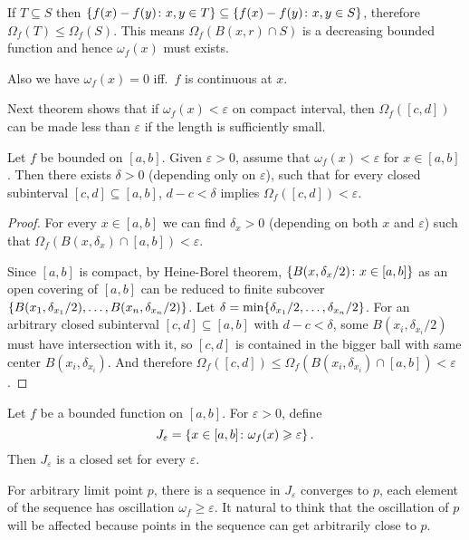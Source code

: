 \documentclass{article}
\DeclarePairedDelimiter\set{\lbrace}{\rbrace}
\begin{document}
If $ T \subseteq S $ then $ \set{f(x) - f(y) \colon x, y \in T} \subseteq \set{f(x) - f(y) \colon x, y \in S} $, therefore $ \Omega_f (T) \leqslant \Omega_f (S) $. This means $ \Omega_f (B(x, r) \cap S) $ is a decreasing bounded function and hence $ \omega_f (x) $ must exists.

Also we have $ \omega_f (x) = 0 $ iff.\ $ f $ is continuous at $ x $.

Next theorem shows that if $ \omega_f (x) < \varepsilon $ on compact interval, then $ \Omega_f ([c, d]) $ can be made less than $ \varepsilon $ if the length is sufficiently small.
\begin{theorem} \label{thm:oscillation-on-interval-control}
    Let $ f $ be bounded on $ [a, b] $. Given $ \varepsilon > 0 $, assume that $ \omega_f (x) < \varepsilon $ for $ x \in [a, b] $. Then there exists $ \delta > 0 $ (depending only on $ \varepsilon $), such that for every closed subinterval $ [c, d] \subseteq [a, b] $, $ d - c < \delta $ implies $ \Omega_f ([c, d]) < \varepsilon $.
\end{theorem}

\begin{proof}
    For every $ x \in [a, b] $ we can find $ \delta_x > 0 $ (depending on both $ x $ and $ \varepsilon $) such that $ \Omega_f (B(x, \delta_x) \cap [a, b]) < \varepsilon $.

    Since $ [a, b] $ is compact, by Heine-Borel theorem, $ \set{B(x, \delta_x / 2) \colon x \in [a, b]} $ as an open covering of $ [a, b] $ can be reduced to finite subcover $ \set{B(x_1, \delta_{x_1} / 2), \dots, B(x_n, \delta_{x_n} / 2)} $. Let $ \delta = \min \set{\delta_{x_1} / 2, \dots, \delta_{x_n} / 2} $. For an arbitrary closed subinterval $ [c, d] \subseteq [a, b] $ with $ d - c < \delta $, some $ B(x_i, \delta_{x_i} / 2) $ must have intersection with it, so $ [c, d] $ is contained in the bigger ball with same center $ B(x_i, \delta_{x_i}) $. And therefore $ \Omega_f ([c, d]) \leqslant \Omega_f (B(x_i, \delta_{x_i}) \cap [a, b]) < \varepsilon $.
\end{proof}

\begin{theorem} \label{thm:compact-J}
    Let $ f $ be a bounded function on $ [a, b] $. For $ \varepsilon > 0 $, define
    \[ 
        J_\varepsilon = \set{x \in [a, b] \colon \omega_f (x) \geqslant \varepsilon} \,.
    \]
    Then $ J_\varepsilon $ is a closed set for every $ \varepsilon $.
\end{theorem}

For arbitrary limit point $ p $, there is a sequence in $ J_\varepsilon $ converges to $ p $, each element of the sequence has oscillation $ \omega_f \geqslant \varepsilon $. It natural to think that the oscillation of $ p $ will be affected because points in the sequence can get arbitrarily close to $ p $.
\end{document}

